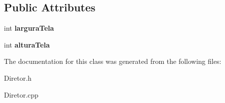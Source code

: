 \subsection*{Public Attributes}
\begin{DoxyCompactItemize}
\item 
\hypertarget{class_edda_1_1_diretor_a8f8ddcb338b975fa7b8cfaa51511b119}{
int {\bfseries larguraTela}}
\label{class_edda_1_1_diretor_a8f8ddcb338b975fa7b8cfaa51511b119}

\item 
\hypertarget{class_edda_1_1_diretor_aeb88898002f2a81c6c0b2ac869720869}{
int {\bfseries alturaTela}}
\label{class_edda_1_1_diretor_aeb88898002f2a81c6c0b2ac869720869}

\end{DoxyCompactItemize}


The documentation for this class was generated from the following files:\begin{DoxyCompactItemize}
\item 
Diretor.h\item 
Diretor.cpp\end{DoxyCompactItemize}
